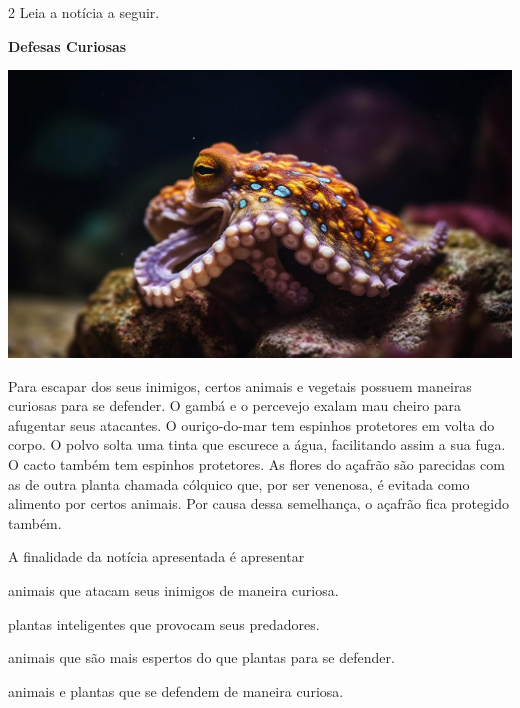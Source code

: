 \num{2} Leia a notícia a seguir.

\begin{myquote}
\textbf{Defesas Curiosas}

\begin{center}
\noindent\includegraphics[width=\textwidth]{media/image20d.jpg}
\end{center}

Para escapar dos seus inimigos, certos animais e vegetais possuem
maneiras curiosas para se defender. O gambá e o percevejo exalam mau
cheiro para afugentar seus atacantes. O ouriço-do-mar tem espinhos
protetores em volta do corpo. O polvo solta uma tinta que escurece a
água, facilitando assim a sua fuga. O cacto também tem espinhos
protetores. As flores do açafrão são parecidas com as de outra planta
chamada cólquico que, por ser venenosa, é evitada como alimento por
certos animais. Por causa dessa semelhança, o açafrão fica protegido
também.

\end{myquote}

A finalidade da notícia apresentada é apresentar

\begin{escolha}
\item animais que atacam seus inimigos de maneira curiosa.

\item plantas inteligentes que provocam seus predadores.

\item animais que são mais espertos do que plantas para se defender.

\item animais e plantas que se defendem de maneira curiosa.
\end{escolha}

